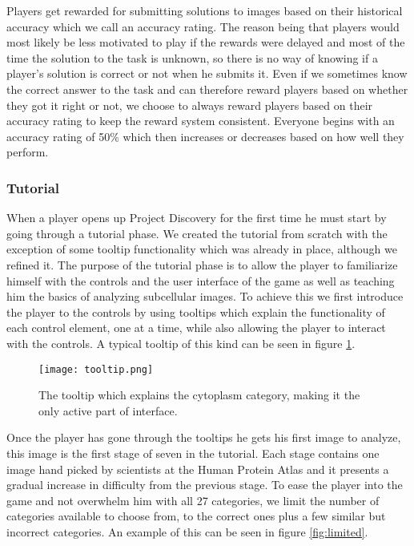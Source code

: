 	Players get rewarded for submitting solutions to images based on their historical accuracy which we call an accuracy rating. The reason being that players would most likely be less motivated to play if the rewards were delayed and most of the time the solution to the task is unknown, so there is no way of knowing if a player's solution is correct or not when he submits it. Even if we sometimes know the correct answer to the task and can therefore reward players based on whether they got it right or not, we choose to always reward players based on their accuracy rating to keep the reward system consistent. Everyone begins with an accuracy rating of 50\% which then increases or decreases based on how well they perform. 

	\subsubsection{Tutorial}
		When a player opens up Project Discovery for the first time he must start by going through a tutorial phase. We created the tutorial from scratch with the exception of some tooltip functionality which was already in place, although we refined it. The purpose of the tutorial phase is to allow the player to familiarize himself with the controls and the user interface of the game as well as teaching him the basics of analyzing subcellular images. To achieve this we first introduce the player to the controls by using tooltips which explain the functionality of each control element, one at a time, while also allowing the player to interact with the controls. A typical tooltip of this kind can be seen in figure \ref{fig:tooltip}.

		\begin{figure}[H]
		  \centering
		  \graphicspath{ {./graphics/} }
		  \centerline{\texttt{[image: tooltip.png]}}
		  \caption{\label{fig:tooltip}The tooltip which explains the cytoplasm category, making it the only active part of interface.}
		\end{figure}

		Once the player has gone through the tooltips he gets his first image to analyze, this image is the first stage of seven in the tutorial. Each stage contains one image hand picked by scientists at the Human Protein Atlas and it presents a gradual increase in difficulty from the previous stage. To ease the player into the game and not overwhelm him with all 27 categories, we limit the number of categories available to choose from, to the correct ones plus a few similar but incorrect categories. An example of this can be seen in figure \ref{fig:limited}.

